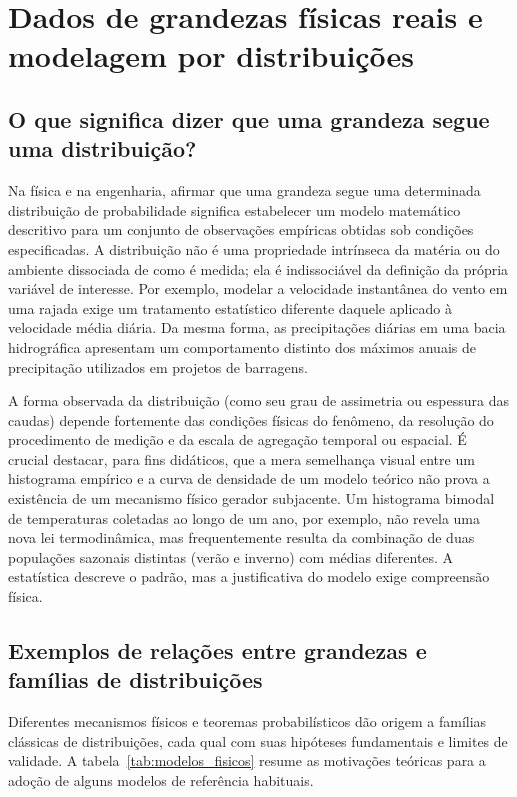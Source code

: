 \section{Dados de grandezas físicas reais e modelagem por distribuições}\label{sec:dados}

\subsection{O que significa dizer que uma grandeza segue uma distribuição?}

Na física e na engenharia, afirmar que uma grandeza segue uma determinada distribuição de probabilidade significa estabelecer um modelo matemático descritivo para um conjunto de observações empíricas obtidas sob condições especificadas. A distribuição não é uma propriedade intrínseca da matéria ou do ambiente dissociada de como é medida; ela é indissociável da definição da própria variável de interesse. Por exemplo, modelar a velocidade instantânea do vento em uma rajada exige um tratamento estatístico diferente daquele aplicado à velocidade média diária. Da mesma forma, as precipitações diárias em uma bacia hidrográfica apresentam um comportamento distinto dos máximos anuais de precipitação utilizados em projetos de barragens.

A forma observada da distribuição (como seu grau de assimetria ou espessura das caudas) depende fortemente das condições físicas do fenômeno, da resolução do procedimento de medição e da escala de agregação temporal ou espacial. É crucial destacar, para fins didáticos, que a mera semelhança visual entre um histograma empírico e a curva de densidade de um modelo teórico não prova a existência de um mecanismo físico gerador subjacente. Um histograma bimodal de temperaturas coletadas ao longo de um ano, por exemplo, não revela uma nova lei termodinâmica, mas frequentemente resulta da combinação de duas populações sazonais distintas (verão e inverno) com médias diferentes. A estatística descreve o padrão, mas a justificativa do modelo exige compreensão física.

\subsection{Exemplos de relações entre grandezas e famílias de distribuições}

Diferentes mecanismos físicos e teoremas probabilísticos dão origem a famílias clássicas de distribuições, cada qual com suas hipóteses fundamentais e limites de validade. A tabela~\ref{tab:modelos_fisicos} resume as motivações teóricas para a adoção de alguns modelos de referência habituais.

